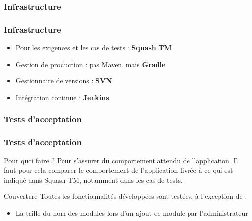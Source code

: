 \documentclass{beamer}
\begin{document}
      \subsubsection{Infrastructure}
      \begin{frame}
        \frametitle{Infrastructure}
        \begin{block}{}
          \begin{itemize}
            \item Pour les exigences et les cas de tests : \textbf{Squash TM}
            \item Gestion de production : pas Maven, mais \textbf{Gradle}
            \item Gestionnaire de versions : \textbf{SVN}
            \item Intégration continue : \textbf{Jenkins}
          \end{itemize}
        \end{block}
      \end{frame}
      
      \subsubsection{Tests d'acceptation}
      \begin{frame}
        \frametitle{Tests d'acceptation}
        \begin{block}{Pour quoi faire ?}
          Pour s'assurer du comportement attendu de l'application. Il faut pour cela comparer le comportement de l'application livrée à ce qui est indiqué dans Squash TM, notamment dans les cas de tests.
        \end{block}
        \begin{block}{Couverture}
          Toutes les fonctionnalités développées sont testées, à l'exception de :
          \begin{itemize}
            \item La taille du nom des modules lors d'un ajout de module par l'administrateur
          \end{itemize}
        \end{block}
      \end{frame}
      
\end{document}

